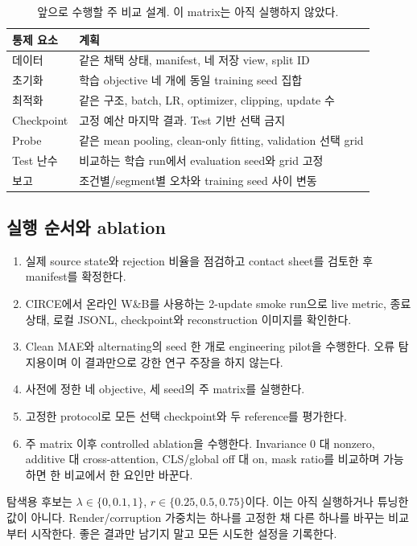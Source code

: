 \documentclass[11pt,a4paper]{article}
\begin{document}
\begin{table}[htbp]\centering\small
\begin{tabularx}{\linewidth}{lX}
\toprule 통제 요소 & 계획 \\\midrule
데이터 & 같은 채택 상태, manifest, 네 저장 view, split ID \\
초기화 & 학습 objective 네 개에 동일 training seed 집합 \\
최적화 & 같은 구조, batch, LR, optimizer, clipping, update 수 \\
Checkpoint & 고정 예산 마지막 결과. Test 기반 선택 금지 \\
Probe & 같은 mean pooling, clean-only fitting, validation 선택 grid \\
Test 난수 & 비교하는 학습 run에서 evaluation seed와 grid 고정 \\
보고 & 조건별/segment별 오차와 training seed 사이 변동 \\\bottomrule
\end{tabularx}
\caption{앞으로 수행할 주 비교 설계. 이 matrix는 아직 실행하지 않았다.}
\end{table}

\subsection{실행 순서와 ablation}
\begin{enumerate}
\item 실제 source state와 rejection 비율을 점검하고 contact sheet를 검토한 후
manifest를 확정한다.
\item CIRCE에서 온라인 W\&B를 사용하는 2-update smoke run으로 live metric,
종료 상태, 로컬 JSONL, checkpoint와 reconstruction 이미지를 확인한다.
\item Clean MAE와 alternating의 seed 한 개로 engineering pilot을 수행한다.
오류 탐지용이며 이 결과만으로 강한 연구 주장을 하지 않는다.
\item 사전에 정한 네 objective, 세 seed의 주 matrix를 실행한다.
\item 고정한 protocol로 모든 선택 checkpoint와 두 reference를 평가한다.
\item 주 matrix 이후 controlled ablation을 수행한다. Invariance 0 대 nonzero,
additive 대 cross-attention, CLS/global off 대 on, mask ratio를 비교하며
가능하면 한 비교에서 한 요인만 바꾼다.
\end{enumerate}
탐색용 후보는 $\lambda\in\{0,0.1,1\}$,
$r\in\{0.25,0.5,0.75\}$이다. 이는 아직 실행하거나 튜닝한 값이 아니다.
Render/corruption 가중치는 하나를 고정한 채 다른 하나를 바꾸는 비교부터 시작한다.
좋은 결과만 남기지 말고 모든 시도한 설정을 기록한다.
\end{document}
